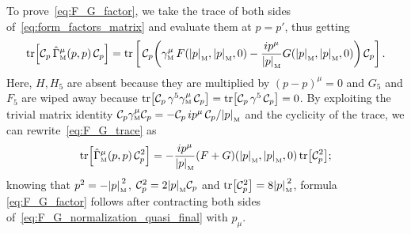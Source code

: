 \documentclass[a4paper, 11pt]{article}
\newcommand{\mnorm}[1]			
	{\abs*{#1}_{\! \scriptscriptstyle \mathrm{M}}}			%
\newcommand{\mink}{{\scriptscriptstyle{\mathrm{M}}}}		%
\newcommand{\mproj}[1]{\mathcal{C}_{#1}}					%
\theoremstyle{thm}
\begin{document}
To prove~\eqref{eq:F_G_factor}, we take the trace of both sides of~\eqref{eq:form_factors_matrix} and evaluate them at $p = p'$, thus getting
\begin{equation}
\label{eq:F_G_trace}
\tr[\mproj{p} \, \hat{\Gamma}^\mu_\mink(p, p) \, \mproj{p}] = \tr \left[ \, \mproj{p} \! \left( \gamma^\mu_\mink \, F(\mnorm{p}, \mnorm{p} , 0) - \frac{ip^\mu}{\mnorm{p}} G(\mnorm{p}, \mnorm{p}, 0) \right) \mproj{p} \right].
\end{equation}
Here, $H, H_5$ are absent because they are multiplied by $(p - p)^\mu = 0$ and $G_5$ and $F_5$ are wiped away because $\tr[ \mproj{p} \, \gamma^5 \gamma^\mu_\mink \, \mproj{p} ] = \tr[ \mproj{p} \, \gamma^5 \, \mproj{p} ] = 0$. By exploiting the trivial matrix identity $\mproj{p} \gamma^\mu_\mink \mproj{p} = - \mproj{p} \, i p^\mu \, \mproj{p}/\mnorm{p}$ and the cyclicity of the trace, we can rewrite~\eqref{eq:F_G_trace} as
\begin{equation}
\label{eq:F_G_normalization_quasi_final}
\tr[\hat{\Gamma}^\mu_\mink(p, p) \, \mproj{p}^2] = - \frac{i p^\mu}{\mnorm{p}} (F + G)(\mnorm{p}, \mnorm{p}, 0) \tr[ \mproj{p}^2 ];
\end{equation}
knowing that $p^2 = -\mnorm{p}^2$, $\mproj{p}^2 = 2 \mnorm{p} \mproj{p}$ and $\tr[\mproj{p}^2] = 8 \mnorm{p}^2$, formula \eqref{eq:F_G_factor} follows after contracting both sides of~\eqref{eq:F_G_normalization_quasi_final} with $p_\mu$.
\end{document}
